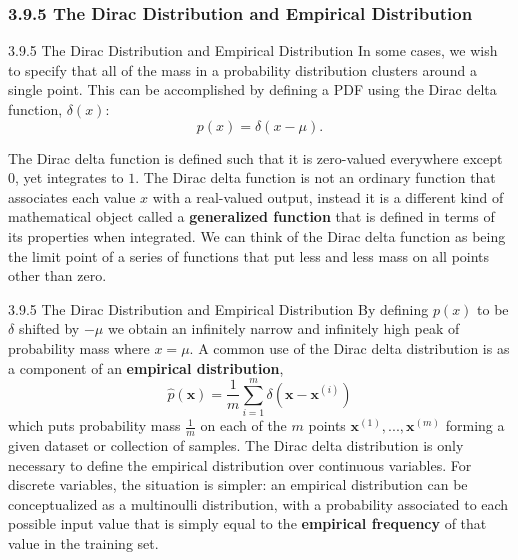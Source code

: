 \subsubsection{3.9.5 The Dirac Distribution and Empirical Distribution}
\begin{frame}{3.9.5 The Dirac Distribution and Empirical Distribution}
    \justifying
    In some cases, we wish to specify that all of the mass in a probability distribution clusters around a single point. This can be accomplished by defining a PDF using the Dirac delta function, $\delta(x)$:
    \begin{equation}
        p(x) = \delta(x - \mu).
        \label{eq:3_27}
    \end{equation}
    
    The Dirac delta function is defined such that it is zero-valued everywhere except $0$, yet integrates to $1$. The Dirac delta function is not an ordinary function that associates each value $x$ with a real-valued output, instead it is a different kind of mathematical object called a \textbf{generalized function} that is defined in terms of its properties when integrated. We can think of the Dirac delta function as being the limit point of a series of functions that put less and less mass on all points other than zero.
\end{frame}

\begin{frame}{3.9.5 The Dirac Distribution and Empirical Distribution}
    \justifying
    By defining $p(x)$ to be $\delta$ shifted by $−\mu$ we obtain an infinitely narrow and infinitely high peak of probability mass where $x = \mu$. A common use of the Dirac delta distribution is as a component of an \textbf{empirical distribution},
    \begin{equation}
        \hat{p}(\boldsymbol{x}) = \frac{1}{m}\sum^{m}_{i = 1} \delta(\boldsymbol{x} - \boldsymbol{x}^{(i)})
        \label{eq:3_28}
    \end{equation}
    which puts probability mass $\frac{1}{m}$ on each of the $m$ points $\boldsymbol{x}^{(1)}, ..., \boldsymbol{x}^{(m)}$ forming a given dataset or collection of samples. The Dirac delta distribution is only necessary to define the empirical distribution over continuous variables. For discrete variables, the situation is simpler: an empirical distribution can be conceptualized as a multinoulli distribution, with a probability associated to each possible input value that is simply equal to the \textbf{empirical frequency} of that value in the training set.
\end{frame}

